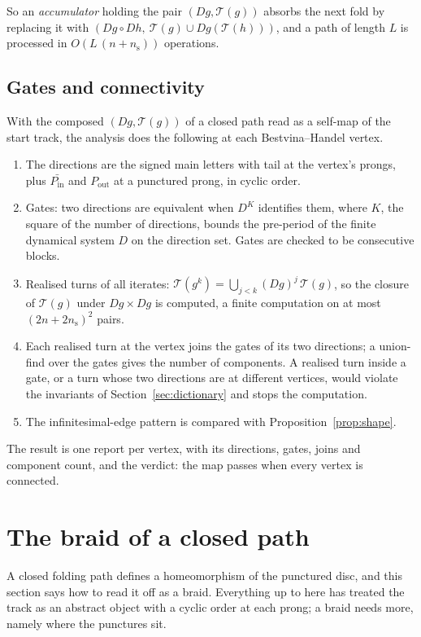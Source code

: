 \documentclass[12pt]{amsart}
\newcommand{\anti}[1]{\bar{#1}}          %
\newcommand{\Dg}{D}                       %
\newcommand{\turns}{\mathcal{T}}
\newcommand{\per}{P}                      %
\theoremstyle{plain}
\theoremstyle{definition}
\begin{document}
So an \emph{accumulator} holding the pair $(\Dg g,\turns(g))$ absorbs the
next fold by replacing it with
$(\Dg g\circ\Dg h,\ \turns(g)\cup\Dg g(\turns(h)))$, and a path of length
$L$ is processed in $O(L\,(n+n_{\mathrm{s}}))$ operations.

\subsection{Gates and connectivity}
With the composed $(\Dg g,\turns(g))$ of a closed path read as a self-map
of the start track, the analysis does the following at each
Bestvina--Handel vertex.
\begin{enumerate}
  \item The directions are the signed main letters with tail at the
    vertex's prongs, plus $\anti{\per_{\mathrm{in}}}$ and
    $\per_{\mathrm{out}}$ at a punctured prong, in cyclic order.
  \item Gates: two directions are equivalent when $\Dg^K$ identifies
    them, where $K$, the square of the number of directions, bounds the
    pre-period of the finite dynamical system $\Dg$ on the direction set.
    Gates are checked to be consecutive blocks.
  \item Realised turns of all iterates: $\turns(g^k)=\bigcup_{j<k}
    (\Dg g)^j\,\turns(g)$, so the closure of $\turns(g)$ under
    $\Dg g\times\Dg g$ is computed, a finite computation on at most
    $(2n+2n_{\mathrm{s}})^2$ pairs.
  \item Each realised turn at the vertex joins the gates of its two
    directions; a union-find over the gates gives the number of
    components.  A realised turn inside a gate, or a turn whose two
    directions are at different vertices, would violate the invariants
    of Section~\ref{sec:dictionary} and stops the computation.
  \item The infinitesimal-edge pattern is compared with
    Proposition~\ref{prop:shape}.
\end{enumerate}
The result is one report per vertex, with its directions, gates, joins
and component count, and the verdict: the map passes when every vertex
is connected.


\section{The braid of a closed path}
\label{sec:braid}

A closed folding path defines a homeomorphism of the punctured disc, and
this section says how to read it off as a braid.  Everything up to here
has treated the track as an abstract object with a cyclic order at each
prong; a braid needs more, namely where the punctures sit.
\end{document}
